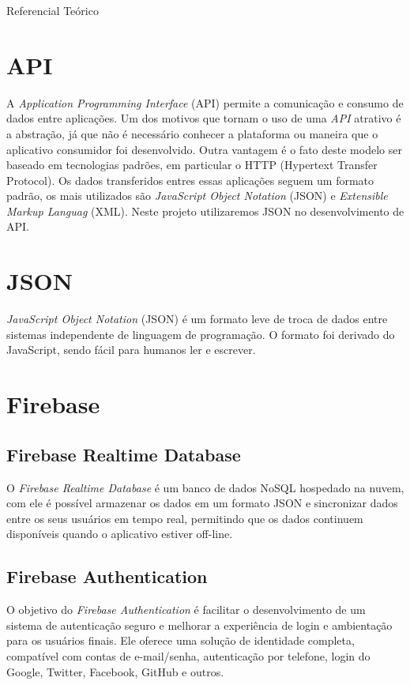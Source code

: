 \documentclass[
	12pt,				%
	openright,			%
	twoside,			%
	a4paper,			%
	english,			%
	french,				%
	spanish,			%
	brazil				%
	]{abntex2}
\begin{document}
\begin{chapter}{Referencial Teórico}
\section{API} \label{API}
A \textit{Application Programming Interface} (API) permite a comunicação e consumo de dados entre aplicações. Um dos motivos que tornam o uso de uma \textit{API} atrativo é a abstração, já que não é necessário conhecer a plataforma ou maneira que o aplicativo consumidor foi desenvolvido. Outra vantagem é o fato deste modelo ser baseado em tecnologias padrões, em particular o HTTP (Hypertext Transfer Protocol). Os dados transferidos entres essas aplicações seguem um formato padrão, os mais utilizados são \textit{JavaScript Object Notation} (JSON) e \textit{Extensible Markup Languag} (XML). Neste projeto utilizaremos JSON no desenvolvimento de API.

\section{JSON}
\textit{JavaScript Object Notation} (JSON) é um formato leve de troca de dados entre sistemas independente de linguagem de programação. O formato foi derivado do JavaScript, sendo fácil para humanos ler e escrever.

\section{Firebase}
\subsection{Firebase Realtime Database} \label{Firebase Realtime Database}
O \textit{Firebase Realtime Database} é um banco de dados NoSQL hospedado na nuvem, com ele é possível armazenar os dados em um formato JSON e sincronizar dados entre os seus usuários em tempo real, permitindo que os dados continuem disponíveis quando o aplicativo estiver off-line.

\subsection{Firebase Authentication}
O objetivo do \textit{Firebase Authentication} é facilitar o desenvolvimento de um sistema de autenticação seguro e melhorar a experiência de login e ambientação para os usuários finais. Ele oferece uma solução de identidade completa, compatível com contas de e-mail/senha, autenticação por telefone, login do Google, Twitter, Facebook, GitHub e outros.

\end{chapter}
\end{document}
